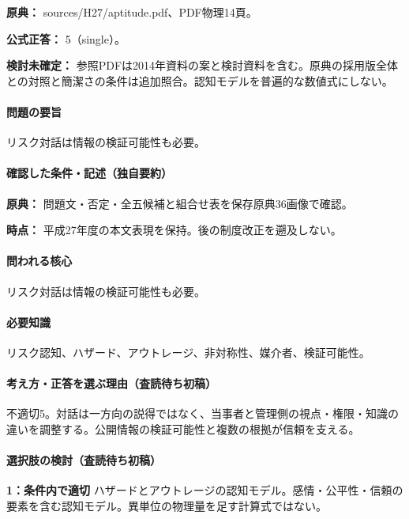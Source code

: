 \noindent\textbf{原典：} sources/H27/aptitude.pdf、PDF物理14頁。

\textbf{公式正答：} 5（single）。

\par\textbf{検討未確定：} 参照PDFは2014年資料の案と検討資料を含む。原典の採用版全体との対照と簡潔さの条件は追加照合。認知モデルを普遍的な数値式にしない。

\paragraph{問題の要旨} リスク対話は情報の検証可能性も必要。

\paragraph{確認した条件・記述（独自要約）}\mbox{}\par

\noindent\textbf{原典：} 問題文・否定・全五候補と組合せ表を保存原典36画像で確認。\par

\noindent\textbf{時点：} 平成27年度の本文表現を保持。後の制度改正を遡及しない。\par

\paragraph{問われる核心} リスク対話は情報の検証可能性も必要。

\paragraph{必要知識} リスク認知、ハザード、アウトレージ、非対称性、媒介者、検証可能性。

\paragraph{考え方・正答を選ぶ理由（査読待ち初稿）} 不適切5。対話は一方向の説得ではなく、当事者と管理側の視点・権限・知識の違いを調整する。公開情報の検証可能性と複数の根拠が信頼を支える。

\paragraph{選択肢の検討（査読待ち初稿）}\mbox{}\par

\noindent\textbf{1：条件内で適切} ハザードとアウトレージの認知モデル。感情・公平性・信頼の要素を含む認知モデル。異単位の物理量を足す計算式ではない。\par

